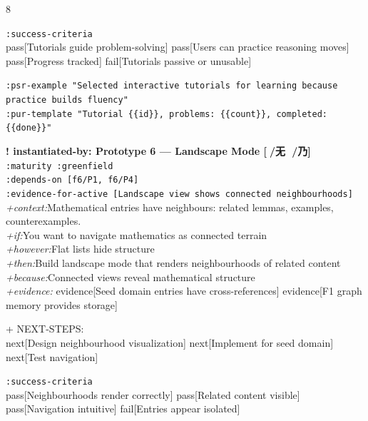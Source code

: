 \documentclass[landscape]{article}
\newcommand{\flexitag}[1]{\textcolor[gray]{0.35}{\textit{#1}}}
\newenvironment{devmapgreenfield}{%
  \def\FrameCommand{\colorbox{devmapgreenfieldbg}}%
  \setlength{\fboxsep}{2pt}%
  \MakeFramed{\advance\hsize-\width \FrameRestore}%
}{\endMakeFramed}
\begin{document}
\begin{paracol}{8}
\begin{devmapgreenfield}
  \texttt{:\allowbreak{}success-\allowbreak{}criteria}\\
    pass[Tutorials guide problem-solving] pass[Users can practice reasoning moves] pass[Progress tracked] fail[Tutorials passive or unusable]\\
\par
  \texttt{:\allowbreak{}psr-\allowbreak{}example "Selected interactive tutorials for learning because practice builds fluency"}\\
  \texttt{:\allowbreak{}pur-\allowbreak{}template "Tutorial \{\{id\}\},\allowbreak{} problems:\allowbreak{} \{\{count\}\},\allowbreak{} completed:\allowbreak{} \{\{done\}\}"}\\
\par
\par
\end{devmapgreenfield}
\begin{devmapgreenfield}
\textbf{! instantiated-by: Prototype 6 — Landscape Mode [🙅/无 🐲/乃]}\\
  \texttt{:\allowbreak{}maturity :\allowbreak{}greenfield}\\
  \texttt{:\allowbreak{}depends-\allowbreak{}on [f6/\allowbreak{}P1,\allowbreak{} f6/\allowbreak{}P4]}\\
  \texttt{:\allowbreak{}evidence-\allowbreak{}for-\allowbreak{}active [Landscape view shows connected neighbourhoods]}\\
  \flexitag{+context:}Mathematical entries have neighbours: related lemmas, examples, counterexamples.\\
  \flexitag{+if:}You want to navigate mathematics as connected terrain\\
  \flexitag{+however:}Flat lists hide structure\\
  \flexitag{+then:}Build landscape mode that renders neighbourhoods of related content\\
  \flexitag{+because:}Connected views reveal mathematical structure\\
  \flexitag{+evidence:} evidence[Seed domain entries have cross-references] evidence[F1 graph memory provides storage]\\
\par
  + NEXT-STEPS:\\
    next[Design neighbourhood visualization] next[Implement for seed domain] next[Test navigation]\\
\par
  \texttt{:\allowbreak{}success-\allowbreak{}criteria}\\
    pass[Neighbourhoods render correctly] pass[Related content visible] pass[Navigation intuitive] fail[Entries appear isolated]\\

\end{devmapgreenfield}
\end{paracol}
\end{document}
